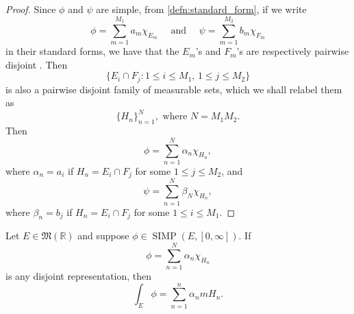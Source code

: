 \documentclass[notoc,notitlepage]{tufte-book}
\DeclareMathOperator{\SIMP}{SIMP}
\begin{document}
\begin{proof}
  Since $\phi$ and $\psi$ are simple, from \cref{defn:standard_form}, if we
  write
  \begin{equation*}
    \phi = \sum_{m=1}^{M_1} a_m \chi_{E_m} \quad \text{ and } \quad
    \psi = \sum_{m=1}^{M_2} b_m \chi_{F_m}
  \end{equation*}
  in their standard forms, we have that the $E_m$'s and $F_m$'s are respectively
  pairwise disjoint . Then
  \begin{equation*}
    \{ E_i \cap F_j : 1 \leq i \leq M_1,\, 1 \leq j \leq M_2 \}
  \end{equation*}
  is also a pairwise disjoint family of measurable sets, which we shall relabel
  them as
  \begin{equation*}
    \{ H_n \}_{n=1}^{N}, \text{ where } N = M_1 M_2.
  \end{equation*}
  Then
  \begin{equation*}
    \phi = \sum_{n=1}^{N} \alpha_n \chi_{H_n},
  \end{equation*}
  where $\alpha_n = a_i$ if $H_n = E_i \cap F_j$ for some $1 \leq j \leq M_2$,
  and
  \begin{equation*}
    \psi = \sum_{n=1}^{N} \beta_N \chi_{H_n},
  \end{equation*}
  where $\beta_n = b_j$ if $H_n = E_i \cap F_j$ for some $1 \leq i \leq M_1$.
\end{proof}

\begin{lemma}\label{lemma:integral_of_a_simple_funciton_using_its_disjoint_representation}
  Let $E \in \mathfrak{M}(\mathbb{R})$ and suppose $\phi \in \SIMP(E, [0,
  \infty])$. If
  \begin{equation*}
    \phi = \sum_{n=1}^{N} \alpha_n \chi_{H_n}
  \end{equation*}
  is any disjoint representation, then
  \begin{equation*}
    \int_{E} \phi = \sum_{n=1}^{n} \alpha_n mH_n.
  \end{equation*}
\end{lemma}
\end{document}
